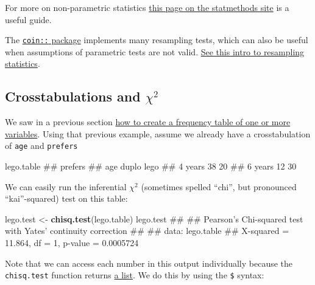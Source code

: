 \documentclass[]{article}
\newenvironment{Shaded}{\begin{snugshade}}{\end{snugshade}}
\newcommand{\KeywordTok}[1]{\textcolor[rgb]{0.13,0.29,0.53}{\textbf{#1}}}
\newcommand{\StringTok}[1]{\textcolor[rgb]{0.31,0.60,0.02}{#1}}
\newcommand{\NormalTok}[1]{#1}
\theoremstyle{definition}
\theoremstyle{definition}
\theoremstyle{definition}
\theoremstyle{remark}
\begin{document}
For more on non-parametric statistics
\href{http://www.statmethods.net/stats/nonparametric.html}{this page on
the statmethods site} is a useful guide.

The
\href{http://finzi.psych.upenn.edu/R/library/coin/doc/coin.pdf}{\texttt{coin::}
package} implements many resampling tests, which can also be useful when
assumptions of parametric tests are not valid.
\href{http://www.statmethods.net/stats/resampling.html}{See this intro
to resampling statistics}.

\hypertarget{crosstabs}{\subsection*{\texorpdfstring{Crosstabulations
and
\(\chi^2\)}{Crosstabulations and \textbackslash{}chi\^{}2}}\label{crosstabs}}

We saw in a previous section \protect\hyperlink{frequency-tables}{how to
create a frequency table of one or more variables}. Using that previous
example, assume we already have a crosstabulation of \texttt{age} and
\texttt{prefers}

\begin{Shaded}
\begin{Highlighting}[]
\NormalTok{lego.table}
\NormalTok{##          prefers}
\NormalTok{## age       duplo lego}
\NormalTok{##   4 years    38   20}
\NormalTok{##   6 years    12   30}
\end{Highlighting}
\end{Shaded}

We can easily run the inferential \(\chi^2\) (sometimes spelled ``chi'',
but pronounced ``kai''-squared) test on this table:

\begin{Shaded}
\begin{Highlighting}[]
\NormalTok{lego.test <-}\StringTok{ }\KeywordTok{chisq.test}\NormalTok{(lego.table)}
\NormalTok{lego.test}
\NormalTok{## }
\NormalTok{##  Pearson's Chi-squared test with Yates' continuity correction}
\NormalTok{## }
\NormalTok{## data:  lego.table}
\NormalTok{## X-squared = 11.864, df = 1, p-value = 0.0005724}
\end{Highlighting}
\end{Shaded}

Note that we can access each number in this output individually because
the \texttt{chisq.test} function returns \protect\hyperlink{lists}{a
list}. We do this by using the \texttt{\$} syntax:
\end{document}
